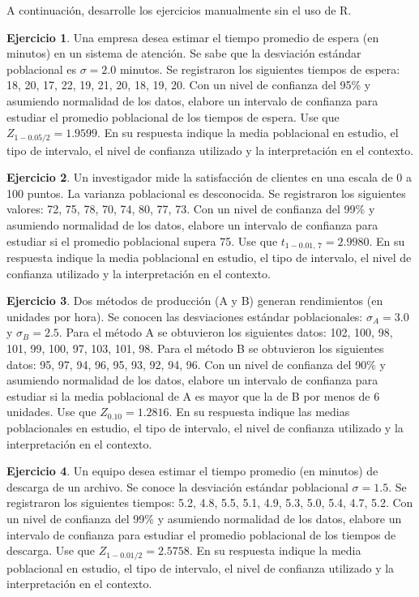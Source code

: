 \documentclass[
  11pt,
]{book}
\theoremstyle{definition}
\theoremstyle{definition}
\theoremstyle{definition}
\newtheorem{exercise}{Ejercicio}[chapter]
\theoremstyle{definition}
\theoremstyle{remark}
\begin{document}
A continuación, desarrolle los ejercicios manualmente sin el uso de R.

\begin{exercise}
Una empresa desea estimar el tiempo promedio de espera (en minutos) en un sistema de atención. Se sabe que la desviación estándar poblacional es \(\sigma = 2.0\) minutos. Se registraron los siguientes tiempos de espera: 18, 20, 17, 22, 19, 21, 20, 18, 19, 20. Con un nivel de confianza del 95\% y asumiendo normalidad de los datos, elabore un intervalo de confianza para estudiar el promedio poblacional de los tiempos de espera. Use que \(Z_{1-0.05/2} = 1.9599\). En su respuesta indique la media poblacional en estudio, el tipo de intervalo, el nivel de confianza utilizado y la interpretación en el contexto.
\end{exercise}

\begin{exercise}
Un investigador mide la satisfacción de clientes en una escala de 0 a 100 puntos. La varianza poblacional es desconocida. Se registraron los siguientes valores: 72, 75, 78, 70, 74, 80, 77, 73. Con un nivel de confianza del 99\% y asumiendo normalidad de los datos, elabore un intervalo de confianza para estudiar si el promedio poblacional supera 75. Use que \(t_{1-0.01,\,7} = 2.9980\). En su respuesta indique la media poblacional en estudio, el tipo de intervalo, el nivel de confianza utilizado y la interpretación en el contexto.
\end{exercise}

\begin{exercise}
Dos métodos de producción (A y B) generan rendimientos (en unidades por hora). Se conocen las desviaciones estándar poblacionales: \(\sigma_A = 3.0\) y \(\sigma_B = 2.5\). Para el método A se obtuvieron los siguientes datos: 102, 100, 98, 101, 99, 100, 97, 103, 101, 98. Para el método B se obtuvieron los siguientes datos: 95, 97, 94, 96, 95, 93, 92, 94, 96. Con un nivel de confianza del 90\% y asumiendo normalidad de los datos, elabore un intervalo de confianza para estudiar si la media poblacional de A es mayor que la de B por menos de 6 unidades. Use que \(Z_{0.10} = 1.2816\). En su respuesta indique las medias poblacionales en estudio, el tipo de intervalo, el nivel de confianza utilizado y la interpretación en el contexto.
\end{exercise}

\begin{exercise}
Un equipo desea estimar el tiempo promedio (en minutos) de descarga de un archivo. Se conoce la desviación estándar poblacional \(\sigma = 1.5\). Se registraron los siguientes tiempos: 5.2, 4.8, 5.5, 5.1, 4.9, 5.3, 5.0, 5.4, 4.7, 5.2. Con un nivel de confianza del 99\% y asumiendo normalidad de los datos, elabore un intervalo de confianza para estudiar el promedio poblacional de los tiempos de descarga. Use que \(Z_{1-0.01/2} = 2.5758\). En su respuesta indique la media poblacional en estudio, el tipo de intervalo, el nivel de confianza utilizado y la interpretación en el contexto.
\end{exercise}
\end{document}
